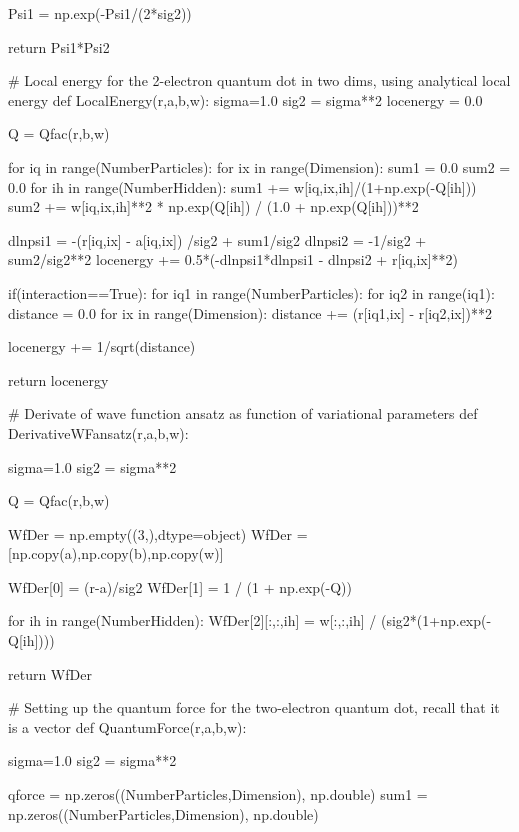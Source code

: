 \documentclass[%
oneside,                 %
final,                   %
10pt]{article}
\begin{document}
    Psi1 = np.exp(-Psi1/(2*sig2))

    return Psi1*Psi2

# Local energy  for the 2-electron quantum dot in two dims, using analytical local energy
def LocalEnergy(r,a,b,w):
    sigma=1.0
    sig2 = sigma**2
    locenergy = 0.0
    
    Q = Qfac(r,b,w)

    for iq in range(NumberParticles):
        for ix in range(Dimension):
            sum1 = 0.0
            sum2 = 0.0
            for ih in range(NumberHidden):
                sum1 += w[iq,ix,ih]/(1+np.exp(-Q[ih]))
                sum2 += w[iq,ix,ih]**2 * np.exp(Q[ih]) / (1.0 + np.exp(Q[ih]))**2
    
            dlnpsi1 = -(r[iq,ix] - a[iq,ix]) /sig2 + sum1/sig2
            dlnpsi2 = -1/sig2 + sum2/sig2**2
            locenergy += 0.5*(-dlnpsi1*dlnpsi1 - dlnpsi2 + r[iq,ix]**2)
            
    if(interaction==True):
        for iq1 in range(NumberParticles):
            for iq2 in range(iq1):
                distance = 0.0
                for ix in range(Dimension):
                    distance += (r[iq1,ix] - r[iq2,ix])**2
                    
                locenergy += 1/sqrt(distance)
                
    return locenergy

# Derivate of wave function ansatz as function of variational parameters
def DerivativeWFansatz(r,a,b,w):
    
    sigma=1.0
    sig2 = sigma**2
    
    Q = Qfac(r,b,w)
    
    WfDer = np.empty((3,),dtype=object)
    WfDer = [np.copy(a),np.copy(b),np.copy(w)]
    
    WfDer[0] = (r-a)/sig2
    WfDer[1] = 1 / (1 + np.exp(-Q))
    
    for ih in range(NumberHidden):
        WfDer[2][:,:,ih] = w[:,:,ih] / (sig2*(1+np.exp(-Q[ih])))
            
    return  WfDer

# Setting up the quantum force for the two-electron quantum dot, recall that it is a vector
def QuantumForce(r,a,b,w):

    sigma=1.0
    sig2 = sigma**2
    
    qforce = np.zeros((NumberParticles,Dimension), np.double)
    sum1 = np.zeros((NumberParticles,Dimension), np.double)
    
\end{document}
